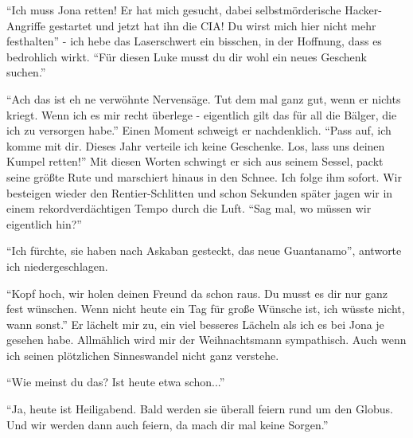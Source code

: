 "`Ich muss Jona retten! Er hat mich gesucht, dabei selbstmörderische Hacker-Angriffe gestartet und jetzt hat ihn die CIA! Du wirst mich hier nicht mehr festhalten"' - ich hebe das Laserschwert ein bisschen, in der Hoffnung, dass es bedrohlich wirkt. "`Für diesen Luke musst du dir wohl ein neues Geschenk suchen."'

"`Ach das ist eh ne verwöhnte Nervensäge. Tut dem mal ganz gut, wenn er nichts kriegt. Wenn ich es mir recht überlege - eigentlich gilt das für all die Bälger, die ich zu versorgen habe."' Einen Moment schweigt er nachdenklich. "`Pass auf, ich komme mit dir. Dieses Jahr verteile ich keine Geschenke. Los, lass uns deinen Kumpel retten!"' Mit diesen Worten schwingt er sich aus seinem Sessel, packt seine größte Rute und marschiert hinaus in den Schnee. Ich folge ihm sofort. Wir besteigen wieder den Rentier-Schlitten und schon Sekunden später jagen wir in einem rekordverdächtigen Tempo durch die Luft. "`Sag mal, wo müssen wir eigentlich hin?"'

"`Ich fürchte, sie haben nach Askaban gesteckt, das neue Guantanamo"', antworte ich niedergeschlagen.

"`Kopf hoch, wir holen deinen Freund da schon raus. Du musst es dir nur ganz fest wünschen. Wenn nicht heute ein Tag für große Wünsche ist, ich wüsste nicht, wann sonst."' Er lächelt mir zu, ein viel besseres Lächeln als ich es bei Jona je gesehen habe. Allmählich wird mir der Weihnachtsmann sympathisch. Auch wenn ich seinen plötzlichen Sinneswandel nicht ganz verstehe.

"`Wie meinst du das? Ist heute etwa schon..."'

"`Ja, heute ist Heiligabend. Bald werden sie überall feiern rund um den Globus. Und wir werden dann auch feiern, da mach dir mal keine Sorgen."'